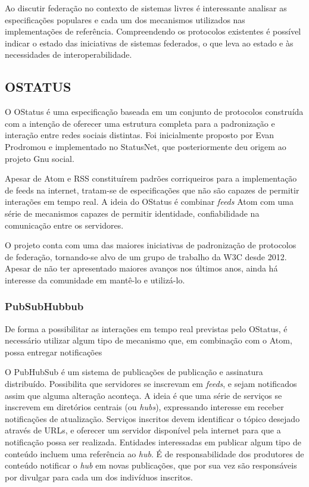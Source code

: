 Ao discutir federação no contexto de sistemas livres é interessante analisar as
especificações populares e cada um dos mecanismos utilizados nas implementações de
referência. Compreendendo os protocolos existentes é possível indicar o estado das
iniciativas de sistemas federados, o que leva ao estado e às necessidades de
interoperabilidade.

\subsection{OSTATUS}

O OStatus é uma especificação baseada em um conjunto de protocolos construída com a
intenção de oferecer uma estrutura completa para a padronização e interação entre
redes sociais distintas. Foi inicialmente proposto por Evan Prodromou e implementado
no StatusNet, que posteriormente deu origem ao projeto Gnu social.

Apesar de Atom e RSS constituírem padrões corriqueiros para a implementação de feeds
na internet, tratam-se de especificações que não são capazes de permitir interações
em tempo real. A ideia do OStatus é combinar \textit{feeds} Atom com uma série de
mecanismos capazes de permitir identidade, confiabilidade na comunicação entre os
servidores.

O projeto conta com uma das maiores iniciativas de padronização de protocolos de
federação, tornando-se alvo de um grupo de trabalho da W3C desde 2012. Apesar de não
ter apresentado maiores avanços nos últimos anos, ainda há interesse da comunidade em
mantê-lo e utilizá-lo. 

\subsubsection{PubSubHubbub}

De forma a possibilitar as interações em tempo real previstas pelo  OStatus, é
necessário utilizar algum tipo de mecanismo que, em combinação com o Atom, possa
entregar notificações 

O PubHubSub é um sistema de publicações de publicação e assinatura distribuído.
Possibilita que servidores se inscrevam em \textit{feeds}, e sejam notificados assim
que alguma alteração aconteça. A ideia é que uma série de serviços se inscrevem em
diretórios centrais (ou \textit{hubs}), expressando interesse em receber notificações
de atualização. Serviços inscritos devem identificar o tópico desejado através de
URLs, e oferecer um servidor disponível pela internet para que a notificação possa
ser realizada. Entidades interessadas em publicar algum tipo de conteúdo incluem uma
referência ao \textit{hub}. É de responsabilidade dos produtores de conteúdo
notificar o \textit{hub} em novas publicações, que por sua vez são responsáveis por
divulgar para cada um dos indivíduos inscritos.

